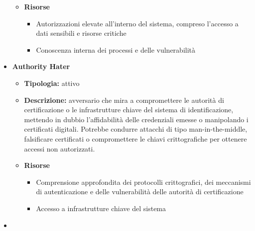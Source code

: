 \begin{itemize}
\begin{itemize}
                \item \textbf{Risorse}
                    \begin{itemize}
                        \item Autorizzazioni elevate all'interno del sistema, compreso l'accesso a dati sensibili e risorse critiche

                        \vspace{3mm}

                        \item Conoscenza interna dei processi e delle vulnerabilità
                    \end{itemize}
            \end{itemize}


        \item \textbf{Authority Hater}
            \begin{itemize}
                \item \textbf{Tipologia:} attivo
                
                \item \textbf{Descrizione:} avversario che mira a compromettere le autorità di certificazione o le infrastrutture chiave del sistema di identificazione, mettendo in dubbio l'affidabilità delle credenziali emesse o manipolando i certificati digitali.
                Potrebbe condurre attacchi di tipo man-in-the-middle, falsificare certificati o compromettere le chiavi crittografiche per ottenere accessi non autorizzati.
                
                \item \textbf{Risorse}
                    \begin{itemize}
                        \item Comprensione approfondita dei protocolli crittografici, dei meccanismi di autenticazione e delle vulnerabilità delle autorità di certificazione

                        \vspace{3mm}

                        \item Accesso a infrastrutture chiave del sistema
                    \end{itemize}
            \end{itemize}

        \item \textbf{}
        
    \end{itemize}


